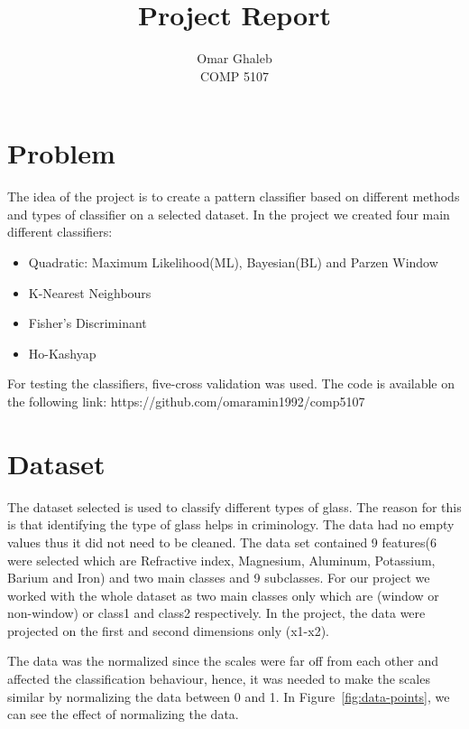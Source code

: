 \documentclass[11pt, oneside]{article}   	%
\title{Project Report}
\author{Omar Ghaleb\\
COMP 5107}
\date{}							%
\begin{document}
\renewcommand\thesubsection{\alph{subsection}.}
\maketitle
\section*{Problem}
The idea of the project is to create a pattern classifier based on different methods and types of classifier on a selected dataset. In the project we created four main different classifiers:
\begin{itemize}
	\item Quadratic: Maximum Likelihood(ML), Bayesian(BL) and Parzen Window
	\item K-Nearest Neighbours
	\item Fisher's Discriminant 
	\item Ho-Kashyap
\end{itemize}
For testing the classifiers, five-cross validation was used.
The code is available on the following link:
https://github.com/omaramin1992/comp5107 

\section*{Dataset}
The dataset selected is used to classify different types of glass. The reason for this is that identifying the type of glass helps in criminology. The data had no empty values thus it did not need to be cleaned. The data set contained 9 features(6 were selected which are Refractive index, Magnesium, Aluminum, Potassium, Barium and Iron) and two main classes and 9 subclasses. For our project we worked with the whole dataset as two main classes only which are (window or non-window) or class1 and class2 respectively. In the project, the data were projected on the first and second dimensions only (x1-x2).

The data was the normalized since the scales were far off from each other and affected the classification behaviour, hence, it was needed to make the scales similar by normalizing the data between 0 and 1. In Figure~\ref{fig:data-points}, we can see the effect of normalizing the data.
\end{document}
